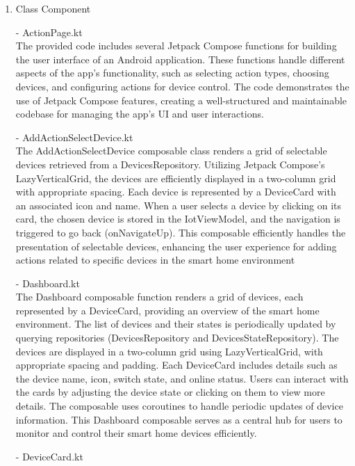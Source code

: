 \begin{enumerate}
      \item Class Component \\
      \item[-] ActionPage.kt \\
            The provided code includes several Jetpack Compose functions for building the user interface of an Android application. These functions handle different aspects of the app's functionality, such as selecting action types, choosing devices, and configuring actions for device control. The code demonstrates the use of Jetpack Compose features, creating a well-structured and maintainable codebase for managing the app's UI and user interactions.\\
      \item[-] AddActionSelectDevice.kt \\
            The AddActionSelectDevice composable class renders a grid of selectable devices retrieved from a DevicesRepository. Utilizing Jetpack Compose's LazyVerticalGrid, the devices are efficiently displayed in a two-column grid with appropriate spacing. Each device is represented by a DeviceCard with an associated icon and name. When a user selects a device by clicking on its card, the chosen device is stored in the IotViewModel, and the navigation is triggered to go back (onNavigateUp). This composable efficiently handles the presentation of selectable devices, enhancing the user experience for adding actions related to specific devices in the smart home environment\\
      \item[-] Dashboard.kt \\
            The Dashboard composable function renders a grid of devices, each represented by a DeviceCard, providing an overview of the smart home environment. The list of devices and their states is periodically updated by querying repositories (DevicesRepository and DevicesStateRepository). The devices are displayed in a two-column grid using LazyVerticalGrid, with appropriate spacing and padding. Each DeviceCard includes details such as the device name, icon, switch state, and online status. Users can interact with the cards by adjusting the device state or clicking on them to view more details. The composable uses coroutines to handle periodic updates of device information. This Dashboard composable serves as a central hub for users to monitor and control their smart home devices efficiently.\\
      \item[-] DeviceCard.kt \\

\end{enumerate}
